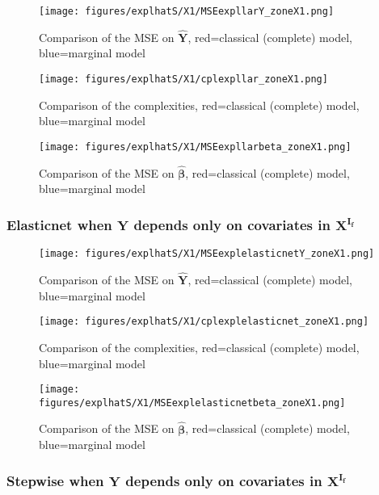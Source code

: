 \documentclass[12pt,a4paper]{report}
\begin{document}
	\begin{figure}[h!]
	\centering
		  \texttt{[image: figures/explhatS/X1/MSEexpllarY\_zoneX1.png]}
		\caption{Comparison of the MSE on $\hat{\boldsymbol{Y}}$, red=classical (complete) model, blue=marginal model}\label{MSEexpllarY_zoneX1}
	\end{figure}
	\begin{figure}[h!]
	\centering
		  \texttt{[image: figures/explhatS/X1/cplexpllar\_zoneX1.png]}
		\caption{Comparison of the complexities, red=classical (complete) model, blue=marginal model}\label{cplexpllar_zoneX1}
	\end{figure}
	\begin{figure}[h!]
	\centering
		  \texttt{[image: figures/explhatS/X1/MSEexpllarbeta\_zoneX1.png]}
		\caption{Comparison of the MSE on $\hat{\boldsymbol{\beta}}$, red=classical (complete) model, blue=marginal model}\label{MSEexpllarbeta_zoneX1}
	\end{figure}
	\FloatBarrier
\newpage
\subsubsection{Elasticnet when $\boldsymbol{Y}$ depends only on covariates in $\boldsymbol{X^{I_f}}$}

	\begin{figure}[h!]
	\centering
		  \texttt{[image: figures/explhatS/X1/MSEexplelasticnetY\_zoneX1.png]}
		\caption{Comparison of the MSE on $\hat{\boldsymbol{Y}}$, red=classical (complete) model, blue=marginal model}\label{MSEexplelasticnetY_zoneX1}
	\end{figure}
	\begin{figure}[h!]
	\centering
		  \texttt{[image: figures/explhatS/X1/cplexplelasticnet\_zoneX1.png]}
		\caption{Comparison of the complexities, red=classical (complete) model, blue=marginal model}\label{cplexplelasticnet_zoneX1}
	\end{figure}
	\begin{figure}[h!]
	\centering
		  \texttt{[image: figures/explhatS/X1/MSEexplelasticnetbeta\_zoneX1.png]}
		\caption{Comparison of the MSE on $\hat{\boldsymbol{\beta}}$, red=classical (complete) model, blue=marginal model}\label{MSEexplelasticnetbeta_zoneX1}
	\end{figure}
	\FloatBarrier
\newpage
\subsubsection{Stepwise when $\boldsymbol{Y}$ depends only on covariates in $\boldsymbol{X^{I_f}}$}
\end{document}
